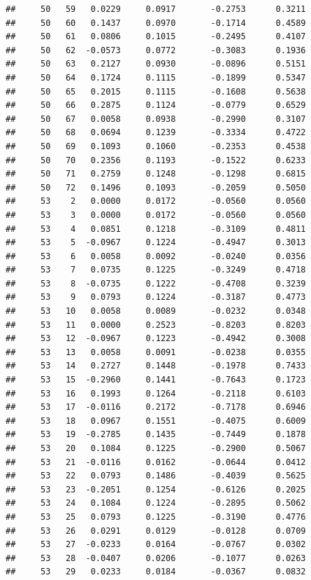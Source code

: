 \documentclass[
]{article}
\begin{document}
\begin{verbatim}
##     50   59   0.0229     0.0917       -0.2753      0.3211  
##     50   60   0.1437     0.0970       -0.1714      0.4589  
##     50   61   0.0806     0.1015       -0.2495      0.4107  
##     50   62  -0.0573     0.0772       -0.3083      0.1936  
##     50   63   0.2127     0.0930       -0.0896      0.5151  
##     50   64   0.1724     0.1115       -0.1899      0.5347  
##     50   65   0.2015     0.1115       -0.1608      0.5638  
##     50   66   0.2875     0.1124       -0.0779      0.6529  
##     50   67   0.0058     0.0938       -0.2990      0.3107  
##     50   68   0.0694     0.1239       -0.3334      0.4722  
##     50   69   0.1093     0.1060       -0.2353      0.4538  
##     50   70   0.2356     0.1193       -0.1522      0.6233  
##     50   71   0.2759     0.1248       -0.1298      0.6815  
##     50   72   0.1496     0.1093       -0.2059      0.5050  
##     53    2   0.0000     0.0172       -0.0560      0.0560  
##     53    3   0.0000     0.0172       -0.0560      0.0560  
##     53    4   0.0851     0.1218       -0.3109      0.4811  
##     53    5  -0.0967     0.1224       -0.4947      0.3013  
##     53    6   0.0058     0.0092       -0.0240      0.0356  
##     53    7   0.0735     0.1225       -0.3249      0.4718  
##     53    8  -0.0735     0.1222       -0.4708      0.3239  
##     53    9   0.0793     0.1224       -0.3187      0.4773  
##     53   10   0.0058     0.0089       -0.0232      0.0348  
##     53   11   0.0000     0.2523       -0.8203      0.8203  
##     53   12  -0.0967     0.1223       -0.4942      0.3008  
##     53   13   0.0058     0.0091       -0.0238      0.0355  
##     53   14   0.2727     0.1448       -0.1978      0.7433  
##     53   15  -0.2960     0.1441       -0.7643      0.1723  
##     53   16   0.1993     0.1264       -0.2118      0.6103  
##     53   17  -0.0116     0.2172       -0.7178      0.6946  
##     53   18   0.0967     0.1551       -0.4075      0.6009  
##     53   19  -0.2785     0.1435       -0.7449      0.1878  
##     53   20   0.1084     0.1225       -0.2900      0.5067  
##     53   21  -0.0116     0.0162       -0.0644      0.0412  
##     53   22   0.0793     0.1486       -0.4039      0.5625  
##     53   23  -0.2051     0.1254       -0.6126      0.2025  
##     53   24   0.1084     0.1224       -0.2895      0.5062  
##     53   25   0.0793     0.1225       -0.3190      0.4776  
##     53   26   0.0291     0.0129       -0.0128      0.0709  
##     53   27  -0.0233     0.0164       -0.0767      0.0302  
##     53   28  -0.0407     0.0206       -0.1077      0.0263  
##     53   29   0.0233     0.0184       -0.0367      0.0832  

\end{verbatim}
\end{document}
